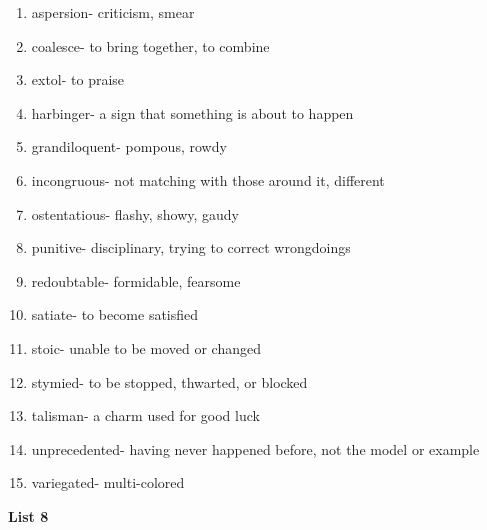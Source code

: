 \begin{enumerate}

\item aspersion- criticism, smear

\item coalesce- to bring together, to combine

\item extol- to praise

\item harbinger- a sign that something is about to happen

\item grandiloquent- pompous, rowdy

\item incongruous- not matching with those around it, different

\item ostentatious- flashy, showy, gaudy

\item punitive- disciplinary, trying to correct wrongdoings
 
\item redoubtable- formidable, fearsome

\item satiate- to become satisfied

\item stoic- unable to be moved or changed

\item stymied- to be stopped, thwarted, or blocked

\item talisman- a charm used for good luck

\item unprecedented- having never happened before, not the model or example

\item variegated- multi-colored

\end{enumerate}

\textbf{List 8}

